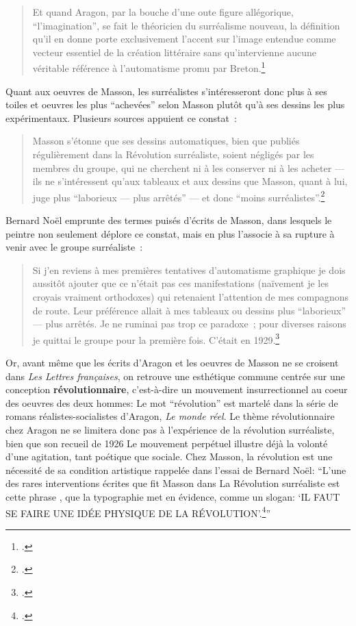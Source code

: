 \begin{quote}
Et quand Aragon, par la bouche d’une oute figure allégorique, \enquote{l’imagination}, se fait le théoricien du surréalisme nouveau, la définition qu’il en donne porte exclusivement l’accent sur l’image entendue comme vecteur essentiel de la création littéraire sans qu’intervienne aucune véritable référence à l’automatisme promu par Breton.\footcite[]{biographie}
\end{quote}

Quant aux oeuvres de Masson, les surréalistes s’intéresseront donc plus à ses toiles et oeuvres les plus \enquote{achevées} selon Masson plutôt qu'à ses dessins les plus expérimentaux. Plusieurs sources appuient ce constat : 

\begin{quote}
Masson s’étonne que ses dessins automatiques, bien que publiés régulièrement dans la Révolution surréaliste, soient négligés par les membres du groupe, qui ne cherchent ni à les conserver ni à les acheter --- ils ne s’intéressent qu’aux tableaux et aux dessins que Masson, quant à lui, juge plus \enquote{laborieux --- plus arrêtés} --- et donc \enquote{moins surréalistes}.\footcite[p. 28]{noel}
\end{quote}
Bernard Noël emprunte des termes puisés d’écrits de Masson, dans lesquels le peintre non seulement déplore ce constat, mais en plus l’associe à sa rupture à venir avec le groupe surréaliste : 
\begin{quote}
Si j’en reviens à mes premières tentatives d’automatisme graphique \textelp{} je dois aussitôt ajouter que ce n’était pas ces manifestations (naïvement je les croyais vraiment orthodoxes) qui retenaient l’attention de mes compagnons de route. Leur préférence allait à mes tableaux ou dessins  plus \enquote{laborieux} –-- plus arrêtés. Je ne ruminai pas trop ce paradoxe ; pour diverses raisons je quittai le groupe pour la première fois. C’était en 1929.\footcite[p. 35]{anneessurrealistes}
\end{quote}
Or, avant même que les écrits d’Aragon et les oeuvres de Masson ne se croisent dans \emph{Les Lettres françaises}, on retrouve une esthétique commune centrée sur une conception \textbf{révolutionnaire}, c’est-à-dire un mouvement insurrectionnel au coeur des oeuvres des deux hommes: Le mot \enquote{révolution} est martelé dans la série de romans réalistes-socialistes d’Aragon, \emph{Le monde réel}. Le thème révolutionnaire chez Aragon ne se limitera donc pas à l’expérience de la révolution surréaliste, bien que son recueil de 1926 Le mouvement perpétuel illustre déjà la volonté d’une agitation, tant poétique que sociale. Chez Masson, la révolution est une nécessité de sa condition artistique rappelée dans l’essai de Bernard Noël: \enquote{L’une des rares interventions écrites que fit Masson dans La Révolution surréaliste est cette phrase , que la typographie met en évidence, comme un slogan: \enquote{IL FAUT SE FAIRE UNE IDÉE PHYSIQUE DE LA RÉVOLUTION}.\footcite[p. 28]{noel}}


